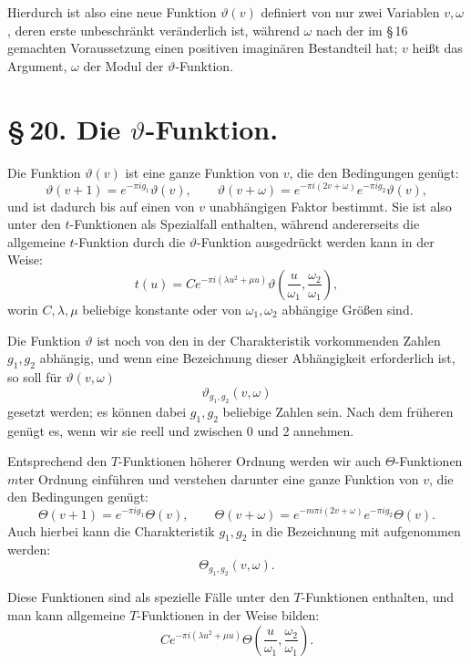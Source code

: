 \documentclass[11pt]{article}
\begin{document}
Hierdurch ist also eine neue Funktion $\vartheta(v)$ definiert von nur zwei Variablen $v,\omega$, deren erste unbeschränkt veränderlich ist, während $\omega$ nach der im \S\,16 gemachten Voraussetzung einen positiven imaginären Bestandteil hat; $v$ heißt das Argument, $\omega$ der Modul der $\vartheta$-Funktion.

\section*{\S\,20. Die $\vartheta$-Funktion.}

Die Funktion $\vartheta(v)$ ist eine ganze Funktion von $v$, die den Bedingungen genügt:
\begin{equation}
\vartheta(v+1)=e^{-\pi i g_1}\vartheta(v),\qquad
\vartheta(v+\omega)=e^{-\pi i(2v+\omega)}e^{-\pi i g_2}\vartheta(v),
\tag{1}
\end{equation}
und ist dadurch bis auf einen von $v$ unabhängigen Faktor bestimmt. Sie ist also unter den $t$-Funktionen als Spezialfall enthalten, während andererseits die allgemeine $t$-Funktion durch die $\vartheta$-Funktion ausgedrückt werden kann in der Weise:
\[
t(u)=Ce^{-\pi i(\lambda u^2+\mu u)}
\vartheta\!\left(\frac{u}{\omega_1},\frac{\omega_2}{\omega_1}\right),
\]
worin $C,\lambda,\mu$ beliebige konstante oder von $\omega_1,\omega_2$ abhängige Größen sind.

Die Funktion $\vartheta$ ist noch von den in der Charakteristik vorkommenden Zahlen $g_1,g_2$ abhängig, und wenn eine Bezeichnung dieser Abhängigkeit erforderlich ist, so soll für $\vartheta(v,\omega)$
\[
\vartheta_{g_1,g_2}(v,\omega)
\]
gesetzt werden; es können dabei $g_1,g_2$ beliebige Zahlen sein. Nach dem früheren genügt es, wenn wir sie reell und zwischen 0 und 2 annehmen.

Entsprechend den $T$-Funktionen höherer Ordnung werden wir auch $\Theta$-Funktionen $m$ter Ordnung einführen und verstehen darunter eine ganze Funktion von $v$, die den Bedingungen genügt:
\begin{equation}
\Theta(v+1)=e^{-\pi i g_1}\Theta(v),\qquad
\Theta(v+\omega)=e^{-m\pi i(2v+\omega)}e^{-\pi i g_2}\Theta(v).
\tag{2}
\end{equation}
Auch hierbei kann die Charakteristik $g_1,g_2$ in die Bezeichnung mit aufgenommen werden:
\[
\Theta_{g_1,g_2}(v,\omega).
\]

Diese Funktionen sind als spezielle Fälle unter den $T$-Funktionen enthalten, und man kann allgemeine $T$-Funktionen in der Weise bilden:
\begin{equation}
Ce^{-\pi i(\lambda u^2+\mu u)}
\Theta\!\left(\frac{u}{\omega_1},\frac{\omega_2}{\omega_1}\right).
\tag{3}
\end{equation}
\end{document}

